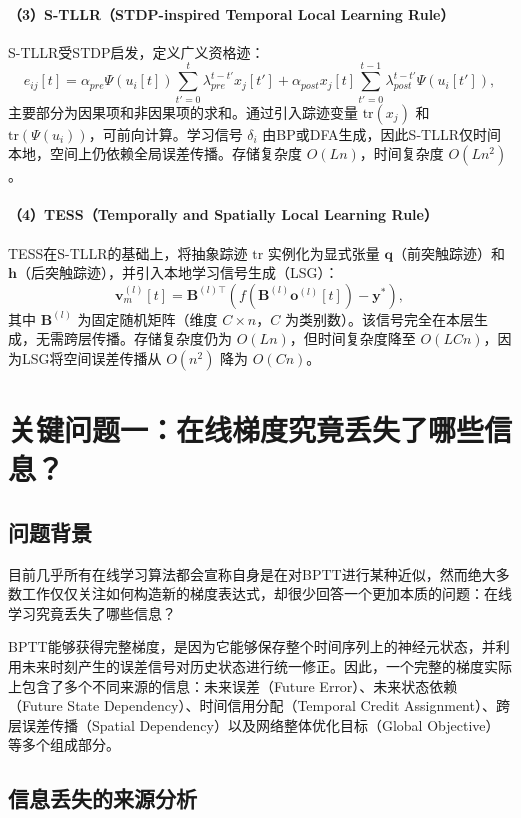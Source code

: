 \documentclass[journal,12pt,onecolumn]{IEEEtran}
\begin{document}
\paragraph{（3）S-TLLR（STDP-inspired Temporal Local Learning Rule）}
S-TLLR受STDP启发，定义广义资格迹：
\[
e_{ij}[t] = \alpha_{pre}\Psi(u_i[t])\sum_{t'=0}^{t}\lambda_{pre}^{t-t'} x_j[t'] + \alpha_{post} x_j[t]\sum_{t'=0}^{t-1}\lambda_{post}^{t-t'} \Psi(u_i[t']),
\]
主要部分为因果项和非因果项的求和。通过引入踪迹变量 \(\text{tr}(x_j)\) 和 \(\text{tr}(\Psi(u_i))\)，可前向计算。学习信号 \(\delta_i\) 由BP或DFA生成，因此S-TLLR仅时间本地，空间上仍依赖全局误差传播。存储复杂度 \(O(Ln)\)，时间复杂度 \(O(Ln^2)\)。

\paragraph{（4）TESS（Temporally and Spatially Local Learning Rule）}
TESS在S-TLLR的基础上，将抽象踪迹 \(\text{tr}\) 实例化为显式张量 \(\mathbf{q}\)（前突触踪迹）和 \(\mathbf{h}\)（后突触踪迹），并引入本地学习信号生成（LSG）：
\[
\mathbf{v}_m^{(l)}[t] = \mathbf{B}^{(l)\top} \left( f(\mathbf{B}^{(l)} \mathbf{o}^{(l)}[t]) - \mathbf{y}^* \right),
\]
其中 \(\mathbf{B}^{(l)}\) 为固定随机矩阵（维度 \(C \times n\)，\(C\) 为类别数）。该信号完全在本层生成，无需跨层传播。存储复杂度仍为 \(O(Ln)\)，但时间复杂度降至 \(O(LCn)\)，因为LSG将空间误差传播从 \(O(n^2)\) 降为 \(O(Cn)\)。


\section{关键问题一：在线梯度究竟丢失了哪些信息？}

\subsection{问题背景}

目前几乎所有在线学习算法都会宣称自身是在对BPTT进行某种近似，然而绝大多数工作仅仅关注如何构造新的梯度表达式，却很少回答一个更加本质的问题：在线学习究竟丢失了哪些信息？

BPTT能够获得完整梯度，是因为它能够保存整个时间序列上的神经元状态，并利用未来时刻产生的误差信号对历史状态进行统一修正。因此，一个完整的梯度实际上包含了多个不同来源的信息：未来误差（Future Error）、未来状态依赖（Future State Dependency）、时间信用分配（Temporal Credit Assignment）、跨层误差传播（Spatial Dependency）以及网络整体优化目标（Global Objective）等多个组成部分。

\subsection{信息丢失的来源分析}
\end{document}
